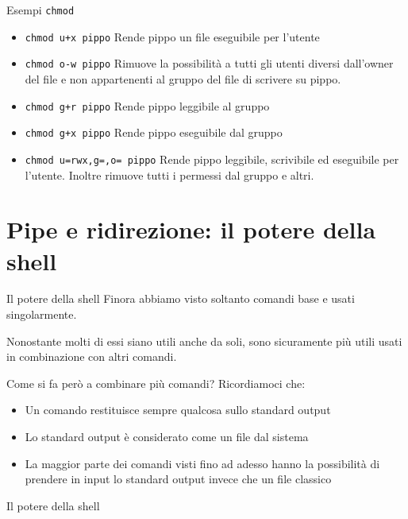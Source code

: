 \documentclass{beamer}
\begin{document}
\begin{frame}{Esempi \texttt{chmod}}
  \begin{itemize}
    \item \texttt{chmod u+x pippo} Rende pippo un file eseguibile per l'utente
    \item \texttt{chmod o-w pippo} Rimuove la possibilità a tutti gli utenti
      diversi dall'owner del file e non appartenenti al gruppo del file di 
      scrivere su pippo.
    \item \texttt{chmod g+r pippo} Rende pippo leggibile al gruppo
    \item \texttt{chmod g+x pippo} Rende pippo eseguibile dal gruppo
    \item \texttt{chmod u=rwx,g=,o= pippo} Rende pippo leggibile, scrivibile ed
      eseguibile per l'utente. Inoltre rimuove tutti i permessi dal gruppo e 
      altri.
  \end{itemize}
\end{frame}

\section{Pipe e ridirezione: il potere della shell}
\begin{frame}{Il potere della shell}
  Finora abbiamo visto soltanto comandi base e usati singolarmente.\bigskip

  Nonostante molti di essi siano utili anche da soli, sono sicuramente più 
  utili usati in combinazione con altri comandi.\bigskip

  Come si fa però a combinare più comandi? \pause
  Ricordiamoci che:
  \begin{itemize}
    \item <2-> Un comando restituisce sempre qualcosa sullo standard output
    \item <3-> Lo standard output è considerato come un file dal sistema
    \item <4-> La maggior parte dei comandi visti fino ad adesso hanno la 
      possibilità di prendere in input lo standard output invece che un file 
      classico
  \end{itemize}
\end{frame}

\begin{frame}{Il potere della shell}
  \begin{figure}
  \end{figure}
\end{frame}
\end{document}
